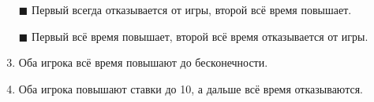 \begin{enumerate}[label=$\square$]
	
	
	
	
	
	
	
	
	
	\item[$\blacksquare$] Первый всегда отказывается от игры, второй всё время повышает.
	\item[$\blacksquare$] Первый всё время повышает, второй всё время отказывается от игры.
	\item Оба игрока всё время повышают до бесконечности.
	\item Оба игрока повышают ставки до 10, а дальше всё время отказываются.
\end{enumerate}

